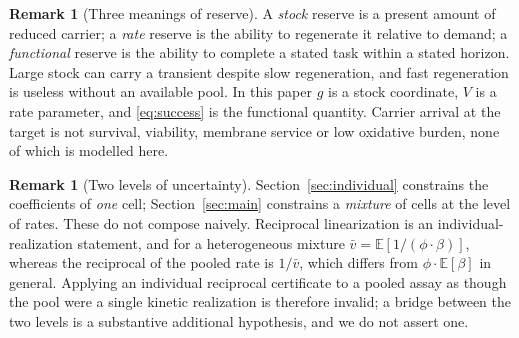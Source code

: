 \documentclass[11pt]{article}
\theoremstyle{definition}
\newtheorem{remark}[theorem]{Remark}
\newcommand{\E}{\mathbb E}
\begin{document}
\begin{remark}[Three meanings of reserve]\label{rem:reserve}
A \emph{stock} reserve is a present amount of reduced carrier; a \emph{rate}
reserve is the ability to regenerate it relative to demand; a
\emph{functional} reserve is the ability to complete a stated task within a
stated horizon. Large stock can carry a transient despite slow regeneration,
and fast regeneration is useless without an available pool. In this paper $g$
is a stock coordinate, $V$ is a rate parameter, and \eqref{eq:success} is the
functional quantity. Carrier arrival at the target is not survival, viability,
membrane service or low oxidative burden, none of which is modelled here.
\end{remark}

\begin{remark}[Two levels of uncertainty]\label{rem:pooling}
Section~\ref{sec:individual} constrains the coefficients of \emph{one} cell;
Section~\ref{sec:main} constrains a \emph{mixture} of cells at the level of
rates. These do not compose naively. Reciprocal linearization is an
individual-realization statement, and for a heterogeneous mixture
$\bar v=\E[1/(\phi\cdot\beta)]$, whereas the reciprocal of the pooled rate is
$1/\bar v$, which differs from $\phi\cdot\E[\beta]$ in general. Applying an
individual reciprocal certificate to a pooled assay as though the pool were a
single kinetic realization is therefore invalid; a bridge between the two
levels is a substantive additional hypothesis, and we do not assert one.
\end{remark}
\end{document}
